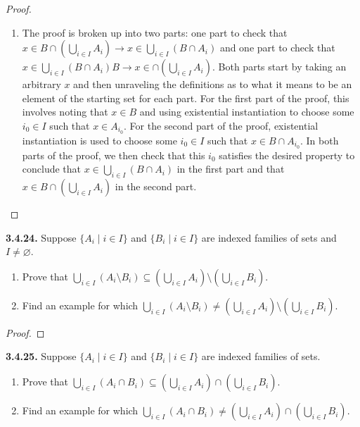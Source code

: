 \documentclass[12pt]{amsart}
\newenvironment{statement}[1]{\smallskip\noindent\color[rgb]{.6627, .3529, .6314} {\bf #1.}}{}
\theoremstyle{definition}
\theoremstyle{remark}
\begin{document}
\begin{proof}
\hfill
\begin{enumerate}
	\item The proof is broken up into two parts: one part to check that
	$x \in B \cap \left( \bigcup_{i \in I} A_i \right) \rightarrow x \in  \bigcup_{i \in I} (B \cap A_i)$
	and one part to check that 
	$x \in \bigcup_{i \in I} (B \cap A_i) B \rightarrow x \in \cap \left( \bigcup_{i \in I} A_i \right)$.
	Both parts start by taking an arbitrary $x$ and then unraveling the definitions as to what
	it means to be an element of the starting set for each part.
	For the first part of the proof, this involves noting that $x \in B$ and using existential instantiation
	to choose some $i_0 \in I$ such that $x \in A_{i_0}$.
	For the second part of the proof, existential instantiation is used to choose some $i_0 \in I$
	such that $x \in B \cap A_{i_0}$.
	In both parts of the proof, we then check that this $i_0$ satisfies the desired property
	to conclude that $x \in \bigcup_{i \in I} (B \cap A_i)$ in the first part and that
	$x \in B \cap \left( \bigcup_{i \in I} A_i \right)$ in the second part.
\end{enumerate}
\end{proof}


\begin{statement}{3.4.24}
Suppose $\{ A_i \mid i \in I \}$ and $\{ B_i \mid i \in I \}$ are indexed families of sets and $I \neq \varnothing$.
\begin{enumerate}
	\item Prove that $\bigcup_{i \in I} (A_i \setminus B_i) \subseteq
	\left( \bigcup_{i \in I} A_i \right) \setminus \left( \bigcup_{i \in I} B_i \right)$.
	
	\item Find an example for which $\bigcup_{i \in I} (A_i \setminus B_i) \neq
	\left( \bigcup_{i \in I} A_i \right) \setminus \left( \bigcup_{i \in I} B_i \right)$.
\end{enumerate}
\end{statement}

\begin{proof}
\end{proof}


\begin{statement}{3.4.25}
Suppose $\{ A_i \mid i \in I \}$ and $\{ B_i \mid i \in I \}$ are indexed families of sets.
\begin{enumerate}
	\item Prove that $\bigcup_{i \in I} (A_i \cap B_i) \subseteq
	\left( \bigcup_{i \in I} A_i \right) \cap \left( \bigcup_{i \in I} B_i \right)$.
	
	\item Find an example for which $\bigcup_{i \in I} (A_i \cap B_i) \neq
	\left( \bigcup_{i \in I} A_i \right) \cap \left( \bigcup_{i \in I} B_i \right)$.
\end{enumerate}
\end{statement}
\end{document}
